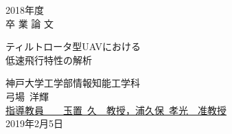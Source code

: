 \newcommand{\hdate}[1]{\setcounter{page}{0}\begin{center}{\LARGE
#1\\}\vskip 20pt {\Huge 卒 業 論 文}\end{center}\vskip 40pt}

\newcommand{\htitle}[1]{
        \begin{center}
                \vskip 16pt
                {\LARGE #1}\\
                \setlength{\unitlength}{1mm}
        \end{center}
        \vskip 40pt
}

\begin{titlepage}
\vspace*{2cm}
\hdate{2018年度}
\htitle{ティルトロータ型UAVにおける\\低速飛行特性の解析}

\hspace{8cm}
\begin{center}
\Large
神戸大学工学部情報知能工学科\\
\vskip 20pt
弓場~洋輝\\
\vskip 40pt
\underline{指導教員~~~~{\Large 玉置~久~~教授，浦久保~孝光~~准教授}}\\
\vskip 20pt
2019年2月5日
\end{center}
\end{titlepage}
